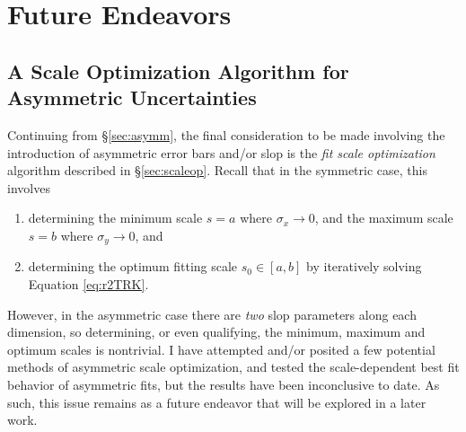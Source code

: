 \chapter{Future Endeavors}
\label{cha:future}

\section{A Scale Optimization Algorithm for Asymmetric Uncertainties}
Continuing from \S\ref{sec:asymm}, the final consideration to be made involving the introduction of asymmetric error bars and/or slop is the \textit{fit scale optimization} algorithm described in \S\ref{sec:scaleop}. Recall that in the symmetric case, this involves
\begin{enumerate}
    \item determining the minimum scale $s=a$ where $\sigma_x\rightarrow 0$, and the maximum scale $s=b$ where $\sigma_y\rightarrow 0$, and
    \item determining the optimum fitting scale $s_0\in [a,b]$ by iteratively solving Equation \eqref{eq:r2TRK}.
\end{enumerate}
However, in the asymmetric case there are \textit{two} slop parameters along each dimension, so determining, or even qualifying, the minimum, maximum and optimum scales is nontrivial. I have attempted and/or posited a few potential methods of asymmetric scale optimization, and tested the scale-dependent best fit behavior of asymmetric fits, but the results have been inconclusive to date. As such, this issue remains as a future endeavor that will be explored in a later work.

